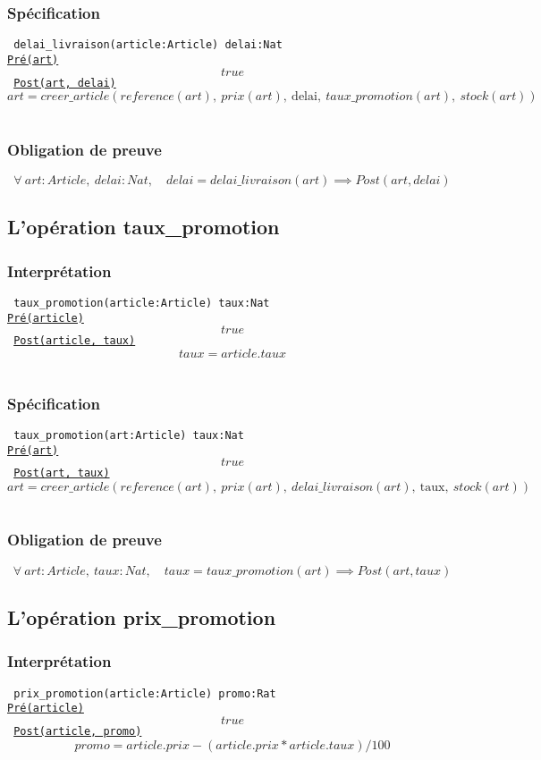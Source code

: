 \documentclass{article}
\begin{document}
\subsubsection{Spécification}
{\tt
delai\_livraison(article:Article) delai:Nat\\
\underline{Pré(art)}
$$ true $$
\underline{Post(art, delai)}
$$ art = creer\_article(reference(art),\ prix(art),\ \text{delai},\ taux\_promotion(art),\ stock(art)) $$
}

\subsubsection{Obligation de preuve}
$$ \forall\ art:Article,\ delai:Nat,\quad delai = delai\_livraison(art) \implies Post(art, delai) $$

\subsection{L'opération taux\_promotion}
\subsubsection{Interprétation}
{\tt
taux\_promotion(article:Article) taux:Nat\\
\underline{Pré(article)}
$$ true $$
\underline{Post(article, taux)}
$$ taux = article.taux $$
}

\subsubsection{Spécification}
{\tt
taux\_promotion(art:Article) taux:Nat\\
\underline{Pré(art)}
$$ true $$
\underline{Post(art, taux)}
$$ art = creer\_article(reference(art),\ prix(art),\ delai\_livraison(art),\ \text{taux},\ stock(art)) $$
}

\subsubsection{Obligation de preuve}
$$ \forall\ art:Article,\ taux:Nat,\quad taux = taux\_promotion(art) \implies Post(art, taux) $$

\subsection{L'opération prix\_promotion}
\subsubsection{Interprétation}
{\tt
prix\_promotion(article:Article) promo:Rat\\
\underline{Pré(article)}
$$ true $$
\underline{Post(article, promo)}
$$ promo = article.prix - (article.prix * article.taux) / 100 $$
}
\end{document}
